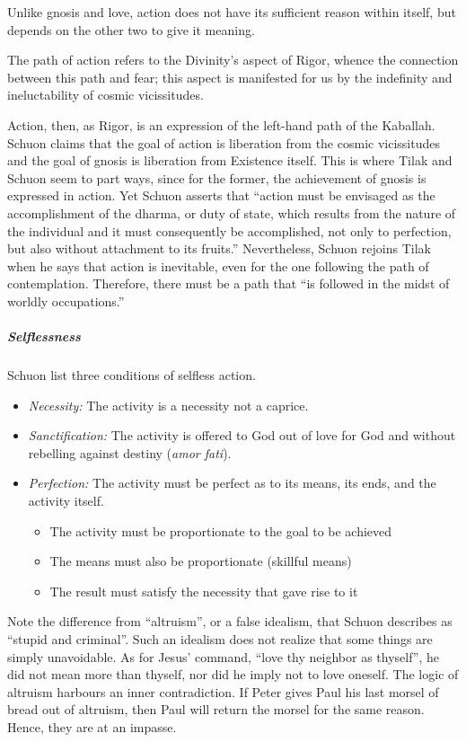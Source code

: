 Unlike gnosis and love, action does not have its sufficient reason within itself, but depends on the other two to give it meaning.

\begin{quotex}
The path of action refers to the Divinity's aspect of Rigor, whence the connection between this path and fear; this aspect is manifested for us by the indefinity and ineluctability of cosmic vicissitudes.
\end{quotex}


Action, then, as Rigor, is an expression of the left-hand path of the Kaballah. Schuon claims that the goal of action is liberation from the cosmic vicissitudes and the goal of gnosis is liberation from Existence itself. This is where Tilak and Schuon seem to part ways, since for the former, the achievement of gnosis is expressed in action. Yet Schuon asserts that ``action must be envisaged as the accomplishment of the dharma, or duty of state, which results from the nature of the individual and it must consequently be accomplished, not only to perfection, but also without attachment to its fruits.'' Nevertheless, Schuon rejoins Tilak when he says that action is inevitable, even for the one following the path of contemplation. Therefore, there must be a path that ``is followed in the midst of worldly occupations.''

\subparagraph{Selflessness}


Schuon list three conditions of selfless action.

\begin{itemize}
\item\textit{Necessity:} The activity is a necessity not a caprice.
\item\textit{Sanctification:} The activity is offered to God out of love for God and without rebelling against destiny (\emph{amor fati}).
\item\textit{Perfection:} The activity must be perfect as to its means, its ends, and the activity itself.
\begin{itemize}
\item The activity must be proportionate to the goal to be achieved
\item The means must also be proportionate (skillful means)
\item The result must satisfy the necessity that gave rise to it
\end{itemize}
\end{itemize}


Note the difference from ``altruism'', or a false idealism, that Schuon describes as ``stupid and criminal''. Such an idealism does not realize that some things are simply unavoidable. As for Jesus' command, ``love thy neighbor as thyself'', he did not mean more than thyself, nor did he imply not to love oneself. The logic of altruism harbours an inner contradiction. If Peter gives Paul his last morsel of bread out of altruism, then Paul will return the morsel for the same reason. Hence, they are at an impasse.


